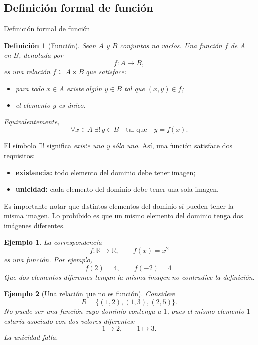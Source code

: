 \documentclass[aspectratio=169,10pt]{beamer}
\newtheorem{definicion}{Definición}
\newtheorem{ejemplo}{Ejemplo}
\newcommand{\R}{\mathbb{R}}
\begin{document}
\subsection*{Definición formal de función}

\begin{frame}{Definición formal de función}

\begin{definicion}[Función]
Sean $A$ y $B$ conjuntos no vacíos. Una \emph{función} $f$ de $A$ en $B$,
denotada por
\[
f:A\longrightarrow B,
\]
es una relación $f\subseteq A\times B$ que satisface:

\begin{itemize}
    \item para todo $x\in A$ existe algún $y\in B$ tal que $(x,y)\in f$;
    \item el elemento $y$ es único.
\end{itemize}

Equivalentemente,
\[
\forall x\in A\;\exists!\,y\in B
\quad\text{tal que}\quad y=f(x).
\]
\end{definicion}

El símbolo $\exists!$ significa \textit{existe uno y sólo uno}. Así, una función satisface dos requisitos:

\begin{itemize}
    \item \textbf{existencia:} todo elemento del dominio debe tener imagen;
    \item \textbf{unicidad:} cada elemento del dominio debe tener una sola imagen.
\end{itemize}

Es importante notar que distintos elementos del dominio sí pueden tener la misma imagen. Lo prohibido es que un mismo elemento del dominio tenga dos imágenes diferentes.

\begin{ejemplo}
La correspondencia
\[
f:\R\to\R,\qquad f(x)=x^2
\]
es una función. Por ejemplo,
\[
f(2)=4,\qquad f(-2)=4.
\]
Que dos elementos diferentes tengan la misma imagen no contradice la
definición.

\end{ejemplo}

\begin{ejemplo}[Una relación que no es función]
Considere
\[
R=\{(1,2),(1,3),(2,5)\}.
\]
No puede ser una función cuyo dominio contenga a $1$, pues el mismo elemento $1$ estaría asociado con dos valores diferentes:
\[
1\mapsto2,\qquad 1\mapsto3.
\]
La unicidad falla.

\end{ejemplo}

\end{frame}
\end{document}
